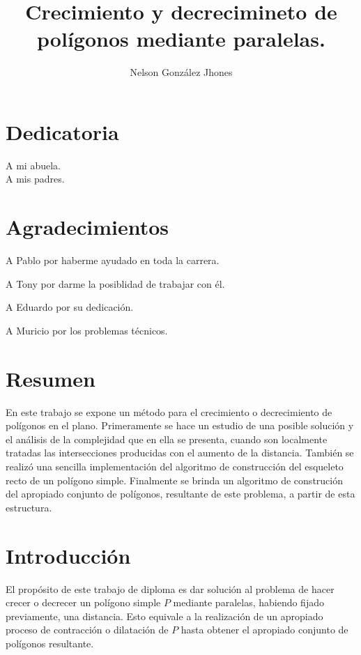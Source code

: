 \documentclass[12pt,english]{report}
\begin{document}
\title{Crecimiento y decrecimineto de pol\'igonos mediante paralelas.}
\author{Nelson Gonz\'{a}lez Jhones}
\maketitle

\chapter*{Dedicatoria}
\begin{flushleft}
A mi abuela. \\
A mis padres.
\end{flushleft}



\chapter*{Agradecimientos}

A Pablo por haberme ayudado en toda la carrera.

A Tony por darme la posiblidad de trabajar con \'el.

A Eduardo por su dedicaci\'on.

A Muricio por los problemas t\'ecnicos.


\chapter*{Resumen}
\noindent En este trabajo se expone un m\'etodo para el crecimiento o decrecimiento de pol\'igonos en el plano. Primeramente se hace un estudio de una posible soluci\'on y el an\'alisis de la complejidad que en ella se presenta, cuando son localmente tratadas las intersecciones producidas con el aumento de la distancia. Tambi\'en se realiz\'o una sencilla implementaci\'on del algoritmo de construcci\'on del esqueleto recto de un pol\'igono simple. Finalmente se brinda un algoritmo de construci\'on del apropiado conjunto de pol\'igonos, resultante de este problema, a partir de esta estructura.

\tableofcontents

\setcounter{secnumdepth}{-1}
\chapter{Introducci\'on}  

 El prop\'osito de este trabajo de diploma es dar soluci\'on al problema de hacer crecer o decrecer un pol\'igono simple $P$ mediante paralelas, habiendo fijado previamente, una distancia. Esto equivale a la realizaci\'on de un apropiado proceso de contracci\'on o dilataci\'on de $P$ hasta obtener el apropiado conjunto de pol\'igonos resultante.
 
\end{document}
